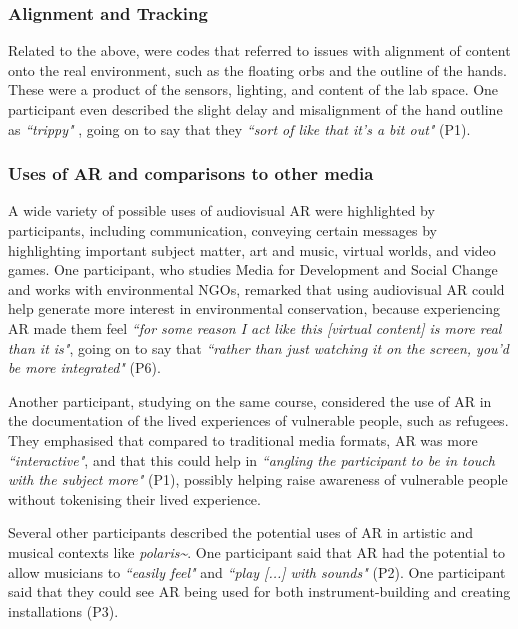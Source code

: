 \subsubsection{Alignment and Tracking}\label{sec: polaris-feedback-adoption-alignment}
Related to the above, were codes that referred to issues with alignment of content onto the real environment, such as the floating orbs and the outline of the hands. These were a product of the sensors, lighting, and content of the lab space. One participant even described the slight delay and misalignment of the hand outline as \textit{``trippy"} , going on to say that they \textit{``sort of like that it’s a bit out"} (P1).

\subsubsection{Uses of AR and comparisons to other media}\label{sec: polaris-feedback-adoption-uses}
A wide variety of possible uses of audiovisual AR were highlighted by participants, including communication, conveying certain messages by highlighting important subject matter, art and music, virtual worlds, and video games.
One participant, who studies Media for Development and Social Change and works with environmental NGOs, remarked that using audiovisual AR could help generate more interest in environmental conservation, because experiencing AR made them feel \textit{``for some reason I act like this [virtual content] is more real than it is"}, going on to say that \textit{``rather than just watching it on the screen, you’d be more integrated"} (P6).

Another participant, studying on the same course, considered the use of AR in the documentation of the lived experiences of vulnerable people, such as refugees. They emphasised that compared to traditional media formats, AR was more \textit{``interactive"}, and that this could help in \textit{``angling the participant to be in touch with the subject more"} (P1), possibly helping raise awareness of vulnerable people without tokenising their lived experience.

Several other participants described the potential uses of AR in artistic and musical contexts like \textit{polaris\textasciitilde{}}. One participant said that AR had the potential to allow musicians to \textit{``easily feel"} and \textit{``play [...] with sounds"} (P2). One participant said that they could see AR being used for both instrument-building and creating installations (P3).

